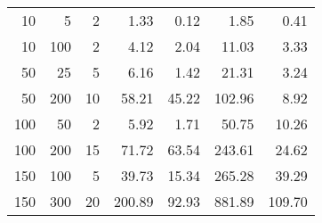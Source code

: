 \begin{tabular}{rrrrrrr}
\toprule
  10 &    5 &   2 &   1.33 &  0.12 &   1.85 &   0.41 \\
  10 &  100 &   2 &   4.12 &  2.04 &  11.03 &   3.33 \\
  50 &   25 &   5 &   6.16 &  1.42 &  21.31 &   3.24 \\
  50 &  200 &  10 &  58.21 & 45.22 & 102.96 &   8.92 \\
 100 &   50 &   2 &   5.92 &  1.71 &  50.75 &  10.26 \\
 100 &  200 &  15 &  71.72 & 63.54 & 243.61 &  24.62 \\
 150 &  100 &   5 &  39.73 & 15.34 & 265.28 &  39.29 \\
 150 &  300 &  20 & 200.89 & 92.93 & 881.89 & 109.70 \\
\bottomrule
\end{tabular}
